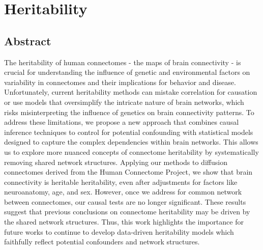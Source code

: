 \chapter{Heritability} \label{chap:heritability}

\pagebreak
\section*{Abstract}
The heritability of human connectomes - the maps of brain connectivity - is crucial for understanding the influence of genetic and environmental factors on variability in connectomes and their implications for behavior and disease. Unfortunately, current heritability methods can mistake correlation for causation or use models that oversimplify the intricate nature of brain networks, which risks misinterpreting the influence of genetics on brain connectivity patterns. To address these limitations, we propose a new approach that combines causal inference techniques to control for potential confounding with statistical models designed to capture the complex dependencies within brain networks. This allows us to explore more nuanced concepts of connectome heritability by systematically removing shared network structures. Applying our methods to diffusion connectomes derived from the Human Connectome Project, we show that brain connectivity is heritable heritability, even after adjustments for factors like neuroanatomy, age, and sex. However, once we address for common network between connectomes, our causal tests are no longer significant. These results suggest that previous conclusions on connectome heritability may be driven by the shared network structures. Thus, this work highlights the importance for future works to continue to develop data-driven heritability models which faithfully reflect potential confounders and network structures.
\pagebreak







